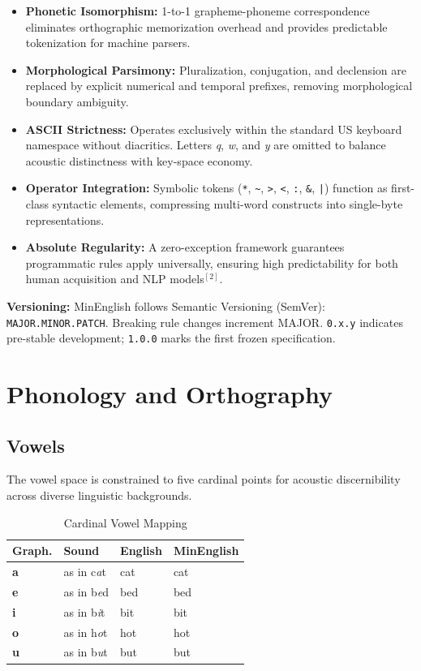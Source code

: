 \documentclass[10pt,onecolumn,letterpaper]{article}
\newcommand{\me}[1]{\texttt{#1}}
\begin{document}
\begin{itemize}[leftmargin=*]
    \item \textbf{Phonetic Isomorphism:} 1-to-1 grapheme-phoneme correspondence eliminates orthographic memorization overhead and provides predictable tokenization for machine parsers.
    \item \textbf{Morphological Parsimony:} Pluralization, conjugation, and declension are replaced by explicit numerical and temporal prefixes, removing morphological boundary ambiguity.
    \item \textbf{ASCII Strictness:} Operates exclusively within the standard US keyboard namespace without diacritics. Letters \textit{q}, \textit{w}, and \textit{y} are omitted to balance acoustic distinctness with key-space economy.
    \item \textbf{Operator Integration:} Symbolic tokens (\me{*}, \me{\~{}}, \me{>}, \me{<}, \me{:}, \me{\&}, \me{|}) function as first-class syntactic elements, compressing multi-word constructs into single-byte representations.
    \item \textbf{Absolute Regularity:} A zero-exception framework guarantees programmatic rules apply universally, ensuring high predictability for both human acquisition and NLP models$^{[2]}$.
\end{itemize}

\textbf{Versioning:} MinEnglish follows Semantic Versioning (SemVer):
\texttt{MAJOR.MINOR.PATCH}. Breaking rule changes increment MAJOR.
\texttt{0.x.y} indicates pre-stable development; \texttt{1.0.0} marks the
first frozen specification.

\section{Phonology and Orthography}

\subsection{Vowels}
The vowel space is constrained to five cardinal points for acoustic
discernibility across diverse linguistic backgrounds.

\begin{table}[h!]
\centering\small
\begin{tabularx}{\linewidth}{lllX}
\toprule
\textbf{Graph.} & \textbf{Sound} & \textbf{English} & \textbf{MinEnglish} \\
\midrule
\textbf{a} & as in c\textit{a}t & cat & cat \\
\textbf{e} & as in b\textit{e}d & bed & bed \\
\textbf{i} & as in b\textit{i}t & bit & bit \\
\textbf{o} & as in h\textit{o}t & hot & hot \\
\textbf{u} & as in b\textit{u}t & but & but \\
\bottomrule
\end{tabularx}
\caption{Cardinal Vowel Mapping}
\end{table}
\end{document}

